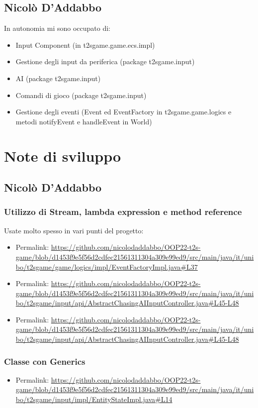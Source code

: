 \documentclass[a4paper,12pt]{report}
\begin{document}
\subsection*{Nicolò D'Addabbo}
In autonomia mi sono occupato di:
\begin{itemize}
\item Input Component (in t2sgame.game.ecs.impl)
\item Gestione degli input da periferica (package t2sgame.input)
\item AI (package t2sgame.input)
\item Comandi di gioco (package t2sgame.input)
\item Gestione degli eventi (Event ed EventFactory in t2sgame.game.logics e metodi notifyEvent e handleEvent in World)
\end{itemize}

\section{Note di sviluppo}

\subsection*{Nicolò D'Addabbo}
\subsubsection*{Utilizzo di Stream, lambda expression e method reference}
Usate molto spesso in vari punti del progetto:
\begin{itemize}
	\item Permalink: \url{https://github.com/nicolodaddabbo/OOP22-t2s-game/blob/d1453f9e5f56d2cdfec21561311304a309e99ed9/src/main/java/it/unibo/t2sgame/game/logics/impl/EventFactoryImpl.java#L37}
	\item Permalink: \url{https://github.com/nicolodaddabbo/OOP22-t2s-game/blob/d1453f9e5f56d2cdfec21561311304a309e99ed9/src/main/java/it/unibo/t2sgame/input/api/AbstractChasingAIInputController.java#L45-L48}
	\item Permalink: \url{https://github.com/nicolodaddabbo/OOP22-t2s-game/blob/d1453f9e5f56d2cdfec21561311304a309e99ed9/src/main/java/it/unibo/t2sgame/input/api/AbstractChasingAIInputController.java#L45-L48}
\end{itemize}
\subsubsection*{Classe con Generics}
\begin{itemize}
	\item Permalink: \url{https://github.com/nicolodaddabbo/OOP22-t2s-game/blob/d1453f9e5f56d2cdfec21561311304a309e99ed9/src/main/java/it/unibo/t2sgame/input/impl/EntityStateImpl.java#L14}
\end{itemize}
\end{document}
